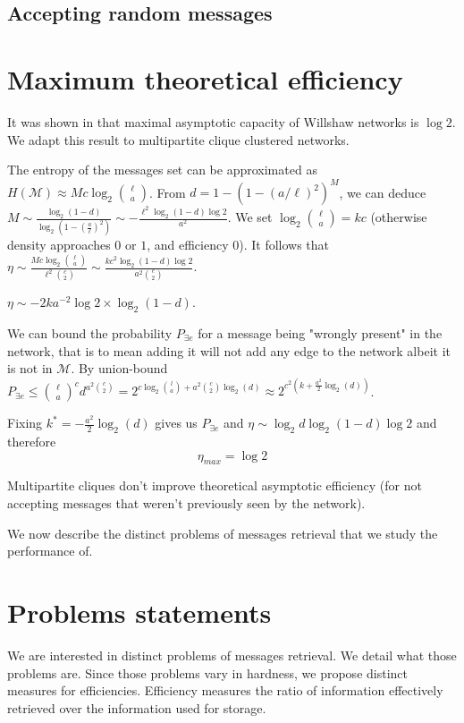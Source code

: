 \documentclass[english,10pt,twocolumn]{IEEEtran}
\renewcommand{\le}{\leqslant}
\theoremstyle{definition}
\begin{document}
	\subsection{Accepting random messages}
		
	\section{Maximum theoretical efficiency}
		It was shown in \cite{Palm1980} that maximal asymptotic capacity of Willshaw networks is $\log 2$. We adapt this result to multipartite clique clustered networks.
		
		The entropy of the messages set can be approximated as $H(\mathcal{M}) \approx M c \log_2 {\ell \choose a}$. From $d = 1 - \left (1- \left(a/\ell\right)^2 \right)^M$, we can deduce $M \sim \frac{\log_2(1-d)}{\log_2(1-(\frac{a}{\ell})^2)} \sim - \frac{\ell^2 \log_2(1-d) \log 2}{a^2}$.
		We set $\log_2 {\ell \choose a} = k c$ (otherwise density approaches $0$ or $1$, and efficiency $0$). It follows that $\eta \sim \frac{M c \log_2 {\ell \choose a}}{\ell^2 {c \choose 2}} \sim \frac{k c^2 \log_2(1-d)\log 2}{a^2 {c \choose 2}}$. 
		
		$\eta \sim - 2 k  a^{-2}\log 2 \times \log_2 (1-d)$.
		
		We can bound the probability $P_{\exists e}$ for a message being "wrongly present" in the network, that is to mean adding it will not add any edge to the network albeit it is not in $\mathcal{M}$. By union-bound $P_{\exists e} \le {\ell \choose a}^c d^{a^2 {c \choose 2}} = 2^{c \log_ 2 {l \choose a} + a^2 {c \choose 2 }\log_2(d)} \approx 2^{c^2(k + \frac{a^2}{2} \log_2 (d))}$.
		
		Fixing $k^* = -\frac{a^2}{2} \log_2 (d)$ gives us $P_{\exists e}$ and $\eta \sim \log_2 d \log_2 (1-d) \log 2$ and therefore \[\eta_{max} = \log 2\]
	
		Multipartite cliques don't improve theoretical asymptotic efficiency (for not accepting messages that weren't previously seen by the network).


	We now describe the distinct problems of messages retrieval that we study the performance of.	
	
	\section{Problems statements}		
	
	We are interested in distinct problems of messages retrieval. We detail what those problems are. Since those problems vary in hardness, we propose distinct measures for efficiencies. Efficiency measures the ratio of information effectively retrieved over the information used for storage.	
	
\end{document}
